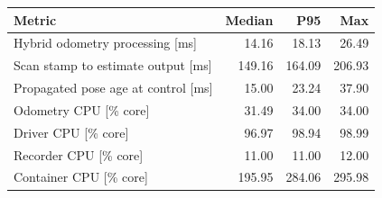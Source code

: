 \begin{tabular}{lrrr}
\hline
Metric & Median & P95 & Max \\
\hline
Hybrid odometry processing [ms] & 14.16 & 18.13 & 26.49 \\
Scan stamp to estimate output [ms] & 149.16 & 164.09 & 206.93 \\
Propagated pose age at control [ms] & 15.00 & 23.24 & 37.90 \\
Odometry CPU [\% core] & 31.49 & 34.00 & 34.00 \\
Driver CPU [\% core] & 96.97 & 98.94 & 98.99 \\
Recorder CPU [\% core] & 11.00 & 11.00 & 12.00 \\
Container CPU [\% core] & 195.95 & 284.06 & 295.98 \\
\hline
\end{tabular}
